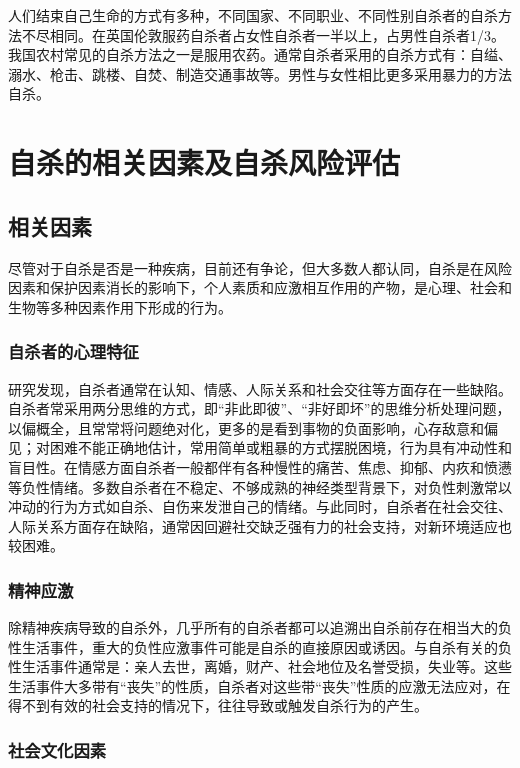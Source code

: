 人们结束自己生命的方式有多种，不同国家、不同职业、不同性别自杀者的自杀方法不尽相同。在英国伦敦服药自杀者占女性自杀者一半以上，占男性自杀者1/3。我国农村常见的自杀方法之一是服用农药。通常自杀者采用的自杀方式有：自缢、溺水、枪击、跳楼、自焚、制造交通事故等。男性与女性相比更多采用暴力的方法自杀。

\section{自杀的相关因素及自杀风险评估}

\subsection{相关因素}

尽管对于自杀是否是一种疾病，目前还有争论，但大多数人都认同，自杀是在风险因素和保护因素消长的影响下，个人素质和应激相互作用的产物，是心理、社会和生物等多种因素作用下形成的行为。

\subsubsection{自杀者的心理特征}

研究发现，自杀者通常在认知、情感、人际关系和社会交往等方面存在一些缺陷。自杀者常采用两分思维的方式，即“非此即彼”、“非好即坏”的思维分析处理问题，以偏概全，且常常将问题绝对化，更多的是看到事物的负面影响，心存敌意和偏见；对困难不能正确地估计，常用简单或粗暴的方式摆脱困境，行为具有冲动性和盲目性。在情感方面自杀者一般都伴有各种慢性的痛苦、焦虑、抑郁、内疚和愤懑等负性情绪。多数自杀者在不稳定、不够成熟的神经类型背景下，对负性刺激常以冲动的行为方式如自杀、自伤来发泄自己的情绪。与此同时，自杀者在社会交往、人际关系方面存在缺陷，通常因回避社交缺乏强有力的社会支持，对新环境适应也较困难。

\subsubsection{精神应激}

除精神疾病导致的自杀外，几乎所有的自杀者都可以追溯出自杀前存在相当大的负性生活事件，重大的负性应激事件可能是自杀的直接原因或诱因。与自杀有关的负性生活事件通常是：亲人去世，离婚，财产、社会地位及名誉受损，失业等。这些生活事件大多带有“丧失”的性质，自杀者对这些带“丧失”性质的应激无法应对，在得不到有效的社会支持的情况下，往往导致或触发自杀行为的产生。

\subsubsection{社会文化因素}

